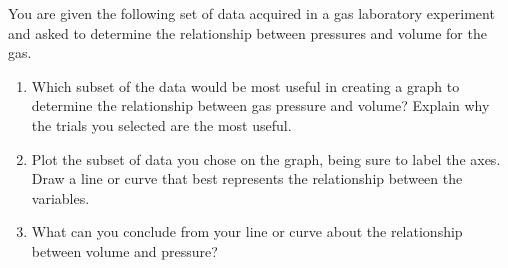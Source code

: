 \documentclass{../../oss-apphys}
\begin{document}
\begin{enumerate}[leftmargin=15pt]
  You are given the following set of data acquired in a gas laboratory
  experiment and asked to determine the relationship between pressures and
  volume for the gas.
  \begin{center}
    \vspace{-.1in}
  \end{center}
  \begin{enumerate}[start=5]
  \item Which subset of the data would be most useful in creating a graph to
    determine the relationship between gas pressure and volume? Explain why the
    trials you selected are the most useful.
    \vspace{1.25in}
    
  \item Plot the subset of data you chose on the graph, being sure to label the
    axes. Draw a line or curve that best represents the relationship between
    the variables.
    \begin{center}
    \end{center}
  \item What can you conclude from your line or curve about the relationship
    between volume and pressure?
  \end{enumerate}
\end{enumerate}
\end{document}
